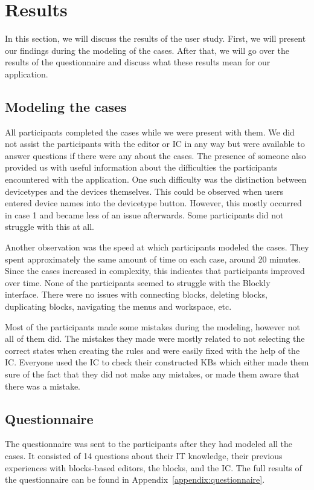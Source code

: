\documentclass[11pt,a4paper]{report}
\begin{document}
\section{Results}
\label{results}
In this section, we will discuss the results of the user study. First, we will present our findings during the modeling of the cases. After that, we will go over the results of the questionnaire and discuss what these results mean for our application.

\subsection{Modeling the cases}
All participants completed the cases while we were present with them. We did not assist the participants with the editor or IC in any way but were available to answer questions if there were any about the cases. The presence of someone also provided us with useful information about the difficulties the participants encountered with the application. One such difficulty was the distinction between devicetypes and the devices themselves. This could be observed when users entered device names into the devicetype button. However, this mostly occurred in case 1 and became less of an issue afterwards. Some participants did not struggle with this at all.

Another observation was the speed at which participants modeled the cases. They spent approximately the same amount of time on each case, around 20 minutes. Since the cases increased in complexity, this indicates that participants improved over time. None of the participants seemed to struggle with the Blockly~\cite{Blockly} interface. There were no issues with connecting blocks, deleting blocks, duplicating blocks, navigating the menus and workspace, etc.

Most of the participants made some mistakes during the modeling, however not all of them did. The mistakes they made were mostly related to not selecting the correct states when creating the rules and were easily fixed with the help of the IC. Everyone used the IC to check their constructed KBs which either made them sure of the fact that they did not make any mistakes, or made them aware that there was a mistake.


\subsection{Questionnaire}
The questionnaire was sent to the participants after they had modeled all the cases. It consisted of 14 questions about their IT knowledge, their previous experiences with blocks-based editors, the blocks, and the IC. The full results of the questionnaire can be found in Appendix~\ref{appendix:questionnaire}.
\end{document}

